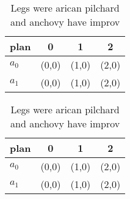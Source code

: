 \documentclass[a4paper]{article}
\begin{document}
\begin{table}
\begin{adjustbox}{width=0.6\columnwidth}
\begin{tabular}{|l|l|l|l|}
\hline
\textbf{plan} & \multicolumn{1}{c|}{\textbf{0}} & \multicolumn{1}{c|}{\textbf{1}} & \multicolumn{1}{c|}{\textbf{2}} \\ \hline
\textbf{$a_0$}  & (0,0) & (1,0) & (2,0) \\ \hline
\textbf{$a_1$}  & (0,0) & (1,0) & (2,0) \\ \hline
\end{tabular}
\end{adjustbox}
\caption{Legs were arican pilchard and anchovy have improv
}
\end{table}

\begin{table}
\begin{adjustbox}{width=0.6\columnwidth}
\begin{tabular}{|l|l|l|l|}
\hline
\textbf{plan} & \multicolumn{1}{c|}{\textbf{0}} & \multicolumn{1}{c|}{\textbf{1}} & \multicolumn{1}{c|}{\textbf{2}} \\ \hline
\textbf{$a_0$}  & (0,0) & (1,0) & (2,0) \\ \hline
\textbf{$a_1$}  & (0,0) & (1,0) & (2,0) \\ \hline
\end{tabular}
\end{adjustbox}
\caption{Legs were arican pilchard and anchovy have improv
}
\end{table}
\end{document}
